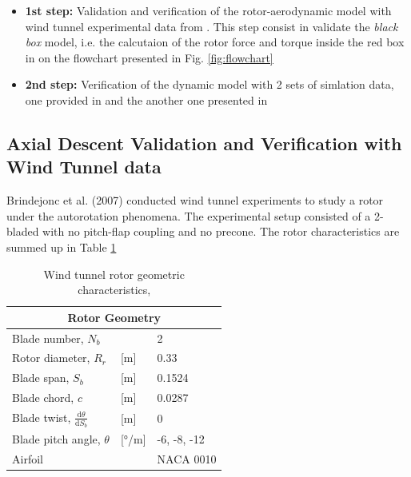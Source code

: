 \begin{itemize}
    \item \textbf{1st step:} Validation and verification of the rotor-aerodynamic model with wind tunnel experimental data from \cite{brindejonc_design_2007}. This step consist in validate the \textit{black box} model, i.e. the calcutaion of the rotor force and torque inside the red box in on the flowchart presented in Fig. \ref{fig:flowchart}
    
    \item \textbf{2nd step:} Verification of the dynamic model with 2 sets of simlation data, one provided in \cite{marques_rocket_2022} and the another one presented in \cite{riegler_daedalus_2018}
\end{itemize}

\subsection{Axial Descent Validation and Verification with Wind Tunnel data}

Brindejonc et al. (2007) \cite{brindejonc_design_2007} conducted wind tunnel experiments to study a rotor under the autorotation phenomena. The experimental setup consisted of a 2-bladed with no pitch-flap coupling and no precone. The rotor characteristics are summed up in Table \ref{tb:geo_paper_validation}

\begin{table}[!htb]
    \centering
    \begin{tabular}{@{}lll@{}}
    \toprule
    \multicolumn{3}{c}{Rotor Geometry} \\ \midrule
    Blade number, $N_b$                   &  & 2           \\
    Rotor diameter, $R_r$ & [\unit{m}]              & 0.33        \\
    Blade span, $S_b$ & [\unit{m}]                  & 0.1524      \\
    Blade chord, $c$ & [\unit{m}]                 & 0.0287      \\
    Blade twist, $\frac{\mathrm{d}\theta}{\mathrm{d}S_b}$ & [\unit{m}]                 & 0           \\
    Blade pitch angle, $\theta$ & [\unit{\degree / m}] & -6, -8, -12 \\
    Airfoil                               &  & NACA 0010   \\ \bottomrule
    \end{tabular}\
    \caption[Wind tunnel rotor geometric characteristics]{Wind tunnel rotor geometric characteristics, \cite{brindejonc_design_2007}}
    \label{tb:geo_paper_validation}
\end{table}

